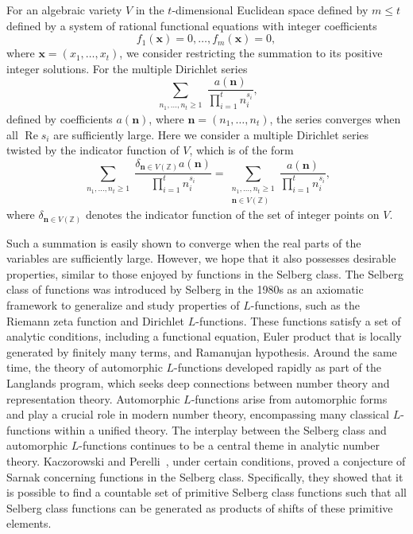 \documentclass[12pt,reqno]{amsart}
\numberwithin{equation}{section}
\theoremstyle{plain}
\theoremstyle{definition}
\theoremstyle{remark}
\renewcommand{\Re}{\operatorname{Re}}
\begin{document}
For an algebraic variety \( V \) in the \( t \)-dimensional Euclidean space defined by \( m \leq t \) defined by a system of rational functional equations with integer coefficients
\[
f_1(\boldsymbol{x}) = 0, \dots, f_m(\boldsymbol{x}) = 0,
\]
where $\boldsymbol{x}=(x_1,\dots,x_t)$, we consider restricting the summation to its positive integer solutions.
For the multiple Dirichlet series
\[
\sum_{\substack{n_1,\dots,n_t \geq 1}}
\frac{ a(\boldsymbol{n})}
{\prod_{i=1}^t n_i^{s_i}},
\]
defined by coefficients \( a(\boldsymbol{n}) \), where $\boldsymbol{n}=(n_1,\dots,n_t)$,
the series converges when all \( \Re s_i \) are sufficiently large.
Here we consider a multiple Dirichlet series twisted by the indicator function of \( V \), which is of the form
\[
\sum_{\substack{n_1,\dots,n_t \geq 1}}
\frac{
\delta_{\boldsymbol{n} \in V(\mathbb{Z})} a(\boldsymbol{n})}{\prod_{i=1}^{t} n_i^{s_i}}
=
\sum_{\substack{n_1,\dots,n_t \geq 1 \\ \boldsymbol{n} \in V(\mathbb{Z})}}
\frac{a(\boldsymbol{n})}{\prod_{i=1}^{t} n_i^{s_i}},
\]
where \( \delta_{\boldsymbol{n} \in V(\mathbb{Z})} \) denotes the indicator function of the set of integer points on \( V \).

Such a summation is easily shown to converge when the real parts of the variables are sufficiently large. However, we hope that it also possesses desirable properties, similar to those enjoyed by functions in the Selberg class.
The Selberg class of functions was introduced by Selberg in the 1980s as an axiomatic framework to generalize and study properties of \( L \)-functions, such as the Riemann zeta function and Dirichlet \( L \)-functions. These functions satisfy a set of analytic conditions, including a functional equation, Euler product that is locally generated by finitely many terms, and Ramanujan hypothesis. Around the same time, the theory of automorphic \( L \)-functions developed rapidly as part of the Langlands program, which seeks deep connections between number theory and representation theory. Automorphic \( L \)-functions arise from automorphic forms and play a crucial role in modern number theory, encompassing many classical \( L \)-functions within a unified theory. The interplay between the Selberg class and automorphic \( L \)-functions continues to be a central theme in analytic number theory.
Kaczorowski and Perelli~\cite{KaczorowskiPerelli3}, under certain conditions, proved a conjecture of Sarnak concerning functions in the Selberg class. Specifically, they showed that it is possible to find a countable set of primitive Selberg class functions such that all Selberg class functions can be generated as products of shifts of these primitive elements.
\end{document}
